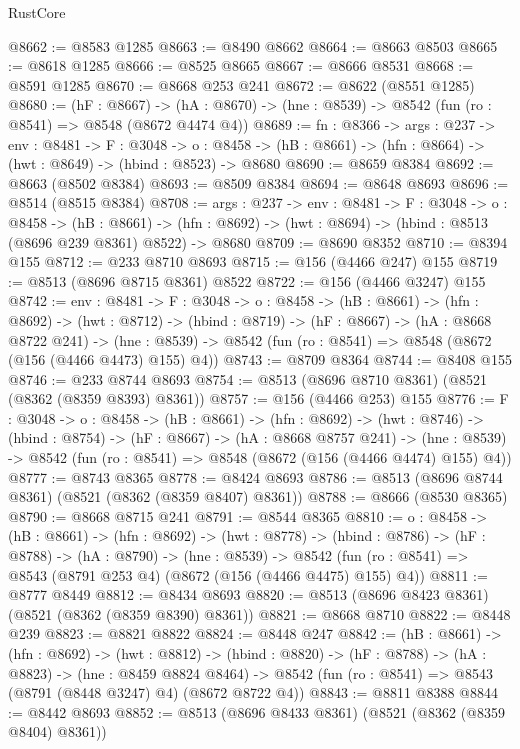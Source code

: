 \begin{lexlean}{RustCore}
\begin{coremodule}
@8662 := @8583 @1285
@8663 := @8490 @8662
@8664 := @8663 @8503
@8665 := @8618 @1285
@8666 := @8525 @8665
@8667 := @8666 @8531
@8668 := @8591 @1285
@8670 := @8668 @253 @241
@8672 := @8622 (@8551 @1285)
@8680 := (hF : @8667) ->
  (hA : @8670) -> (hne : @8539) -> @8542 (fun (ro : @8541) => @8548 (@8672 @4474 @4))
@8689 := {fn : @8366} ->
  {args : @237} ->
  {env : @8481} ->
  {F : @3048} ->
  {o : @8458} -> (hB : @8661) -> (hfn : @8664) -> (hwt : @8649) -> (hbind : @8523) -> @8680
@8690 := @8659 @8384
@8692 := @8663 (@8502 @8384)
@8693 := @8509 @8384
@8694 := @8648 @8693
@8696 := @8514 (@8515 @8384)
@8708 := {args : @237} ->
  {env : @8481} ->
  {F : @3048} ->
  {o : @8458} ->
  (hB : @8661) ->
  (hfn : @8692) -> (hwt : @8694) -> (hbind : @8513 (@8696 @239 @8361) @8522) -> @8680
@8709 := @8690 @8352
@8710 := @8394 @155
@8712 := @233 @8710 @8693
@8715 := @156 (@4466 @247) @155
@8719 := @8513 (@8696 @8715 @8361) @8522
@8722 := @156 (@4466 @3247) @155
@8742 := {env : @8481} ->
  {F : @3048} ->
  {o : @8458} ->
  (hB : @8661) ->
  (hfn : @8692) ->
  (hwt : @8712) ->
  (hbind : @8719) ->
  (hF : @8667) ->
  (hA : @8668 @8722 @241) ->
  (hne : @8539) -> @8542 (fun (ro : @8541) => @8548 (@8672 (@156 (@4466 @4473) @155) @4))
@8743 := @8709 @8364
@8744 := @8408 @155
@8746 := @233 @8744 @8693
@8754 := @8513 (@8696 @8710 @8361) (@8521 (@8362 (@8359 @8393) @8361))
@8757 := @156 (@4466 @253) @155
@8776 := {F : @3048} ->
  {o : @8458} ->
  (hB : @8661) ->
  (hfn : @8692) ->
  (hwt : @8746) ->
  (hbind : @8754) ->
  (hF : @8667) ->
  (hA : @8668 @8757 @241) ->
  (hne : @8539) -> @8542 (fun (ro : @8541) => @8548 (@8672 (@156 (@4466 @4474) @155) @4))
@8777 := @8743 @8365
@8778 := @8424 @8693
@8786 := @8513 (@8696 @8744 @8361) (@8521 (@8362 (@8359 @8407) @8361))
@8788 := @8666 (@8530 @8365)
@8790 := @8668 @8715 @241
@8791 := @8544 @8365
@8810 := {o : @8458} ->
  (hB : @8661) ->
  (hfn : @8692) ->
  (hwt : @8778) ->
  (hbind : @8786) ->
  (hF : @8788) ->
  (hA : @8790) ->
  (hne : @8539) ->
  @8542 (fun (ro : @8541) => @8543 (@8791 @253 @4) (@8672 (@156 (@4466 @4475) @155) @4))
@8811 := @8777 @8449
@8812 := @8434 @8693
@8820 := @8513 (@8696 @8423 @8361) (@8521 (@8362 (@8359 @8390) @8361))
@8821 := @8668 @8710
@8822 := @8448 @239
@8823 := @8821 @8822
@8824 := @8448 @247
@8842 := (hB : @8661) ->
  (hfn : @8692) ->
  (hwt : @8812) ->
  (hbind : @8820) ->
  (hF : @8788) ->
  (hA : @8823) ->
  (hne : @8459 @8824 @8464) ->
  @8542 (fun (ro : @8541) => @8543 (@8791 (@8448 @3247) @4) (@8672 @8722 @4))
@8843 := @8811 @8388
@8844 := @8442 @8693
@8852 := @8513 (@8696 @8433 @8361) (@8521 (@8362 (@8359 @8404) @8361))

\end{coremodule}
\end{lexlean}
